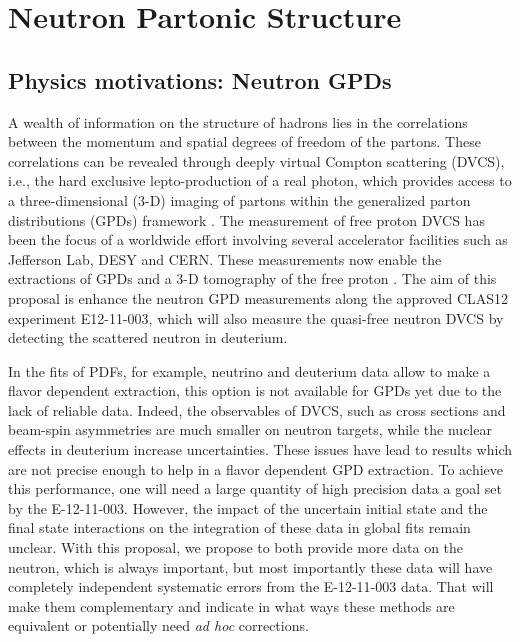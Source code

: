 \chapter{Neutron Partonic Structure}
\label{chap:physics}

\section{Physics motivations: Neutron GPDs}

A wealth of information on the structure of hadrons lies in the correlations 
between the momentum and spatial degrees of freedom of the partons. These 
correlations can be revealed through deeply virtual Compton scattering (DVCS), 
i.e., the hard exclusive lepto-production of a real photon, which provides 
access to a three-dimensional (3-D) imaging of partons within the generalized 
parton distributions (GPDs) framework 
\cite{Mueller:1998fv,PhysRevLett.78.610,PhysRevD.55.7114,Radyushkin:1996nd,PhysRevD.56.5524}.   
The measurement of free proton DVCS has been the focus of a worldwide effort 
\cite{PhysRevLett.87.182002,
   PhysRevLett.87.182001,
   PhysRevD.75.011103,
   Girod:2007aa,
   PhysRevC.92.055202,
   PhysRevLett.99.242501,
   PhysRevC.80.035206,
   PhysRevLett.114.032001,
   Jo:2015ema}
involving several accelerator facilities such as Jefferson Lab, DESY and  
CERN. These measurements now enable the extractions of GPDs and a 3-D 
tomography of the free proton \cite{Guidal:2013rya, PhysRevD.95.011501}. The 
aim of this proposal is enhance the neutron GPD measurements along the approved 
CLAS12 experiment E12-11-003, which will also measure the quasi-free neutron 
DVCS by detecting the scattered neutron in deuterium.  

In the fits of PDFs, \cite{Ball:2014uwa} for example, neutrino and deuterium data allow to make
a flavor dependent extraction, this option is not available for GPDs yet due to 
the lack of reliable data. Indeed, the observables of DVCS, such as cross sections
and beam-spin asymmetries are much smaller on neutron targets, while the nuclear
effects in deuterium increase uncertainties. These issues have lead to results
\cite{Mazouz:2007aa} which are not precise enough to help in a flavor dependent GPD extraction.
To achieve this performance, one will need a large quantity of high precision data
a goal set by the E-12-11-003. However, the impact of the uncertain initial state and the
final state interactions on the integration of these data in global fits remain 
unclear. With this proposal, we propose to both provide more data on the neutron,
which is always important, but most importantly these data will have completely 
independent systematic errors from the E-12-11-003 data. That will make them complementary
and indicate in what ways these methods are equivalent or potentially need {\it ad hoc}
corrections.

